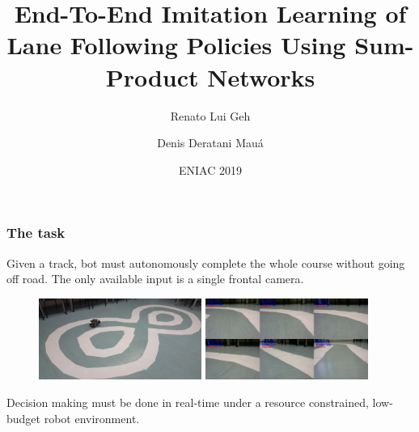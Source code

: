 \documentclass{beamer}
\title[Self-driving with SPNs]{End-To-End Imitation Learning of Lane Following Policies Using
Sum-Product Networks}
\date{ENIAC 2019}
\author[R. Geh, D. Mauá]{Renato Lui Geh \and Denis Deratani Mauá}
\institute[IME-USP]{Institute of Mathematics and Statistics \\\scriptsize University of São Paulo}
\begin{document}
\maketitle

\begin{frame}
  \frametitle{The task}

  Given a track, bot must autonomously complete the whole course without going off road. The only
  available input is a single frontal camera.

  \begin{figure}[h]
    \centering\includegraphics[width=0.475\textwidth]{imgs/track_1_resize.png}
    \includegraphics[width=0.475\textwidth]{imgs/demo_merged_pairs_small.png}
  \end{figure}

  Decision making must be done in real-time under a resource constrained, low-budget robot
  environment.

\end{frame}
\end{document}
